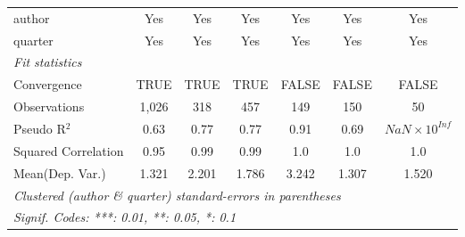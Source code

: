 \begin{tabular}{lcccccc}
   author                                                     & Yes           & Yes           & Yes        & Yes            & Yes           & Yes\\  
   quarter                                                    & Yes           & Yes           & Yes        & Yes            & Yes           & Yes\\  
   \midrule
   \emph{Fit statistics}\\
   Convergence                                                &TRUE           & TRUE          & TRUE       & FALSE          & FALSE         & FALSE\\  
   Observations                                               & 1,026         & 318           & 457        & 149            & 150           & 50\\  
   Pseudo R$^2$                                               & 0.63          & 0.77          & 0.77       & 0.91           & 0.69          & $NaN\times 10^{Inf}$\\   
   Squared Correlation                                        & 0.95          & 0.99          & 0.99       & 1.0            & 1.0           & 1.0\\  
Mean(Dep. Var.) & 1.321 & 2.201 & 1.786 & 3.242 & 1.307 & 1.520 \\
   \midrule \midrule
   \multicolumn{7}{l}{\emph{Clustered (author \& quarter) standard-errors in parentheses}}\\
   \multicolumn{7}{l}{\emph{Signif. Codes: ***: 0.01, **: 0.05, *: 0.1}}\\
\end{tabular}
\par\endgroup
